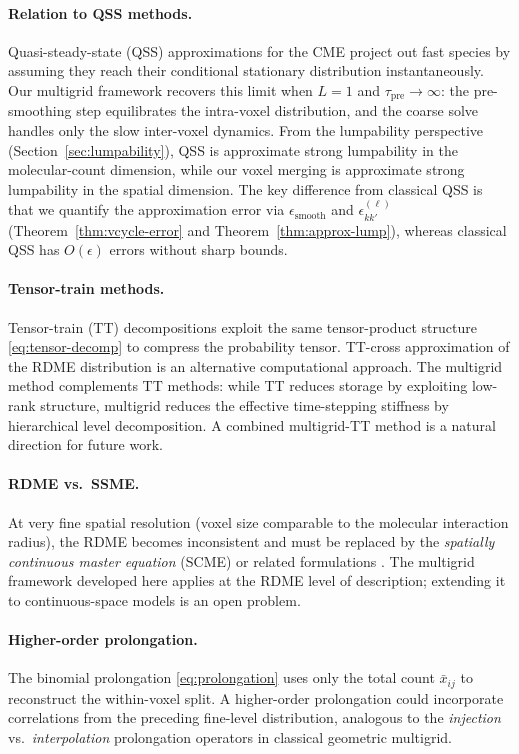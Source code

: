 \documentclass[review,onefignum,onetabnum]{siamart171218}
\begin{document}
\paragraph{Relation to QSS methods.}
Quasi-steady-state (QSS) approximations for the CME \cite{peles}
project out fast species by assuming they reach their conditional
stationary distribution instantaneously.  Our multigrid framework
recovers this limit when $L=1$ and $\tau_{\mathrm{pre}} \to \infty$:
the pre-smoothing step equilibrates the intra-voxel distribution,
and the coarse solve handles only the slow inter-voxel dynamics.
From the lumpability perspective (Section~\ref{sec:lumpability}),
QSS is approximate strong lumpability in the molecular-count
dimension, while our voxel merging is approximate strong
lumpability in the spatial dimension.  The key difference from
classical QSS is that we quantify the approximation error via
$\epsilon_{\mathrm{smooth}}$ and $\epsilon_{kk'}^{(\ell)}$
(Theorem~\ref{thm:vcycle-error} and
Theorem~\ref{thm:approx-lump}), whereas classical QSS has
$O(\epsilon)$ errors without sharp bounds.

\paragraph{Tensor-train methods.}
Tensor-train (TT) decompositions \cite{Kazeev2014} exploit the
same tensor-product structure \eqref{eq:tensor-decomp} to
compress the probability tensor.  TT-cross approximation of the
RDME distribution is an alternative computational approach.  The
multigrid method complements TT methods: while TT reduces storage
by exploiting low-rank structure, multigrid reduces the effective
time-stepping stiffness by hierarchical level decomposition.  A
combined multigrid-TT method is a natural direction for future
work.

\paragraph{RDME vs.\ SSME.}
At very fine spatial resolution (voxel size comparable to the
molecular interaction radius), the RDME becomes inconsistent and
must be replaced by the \emph{spatially continuous master
equation} (SCME) or related formulations \cite{Hellander2012}.
The multigrid framework developed here applies at the RDME level
of description; extending it to continuous-space models is an
open problem.

\paragraph{Higher-order prolongation.}
The binomial prolongation \eqref{eq:prolongation} uses only the
total count $\bar{x}_{ij}$ to reconstruct the within-voxel split.
A higher-order prolongation could incorporate correlations from
the preceding fine-level distribution, analogous to the
\emph{injection} vs.\ \emph{interpolation} prolongation operators
in classical geometric multigrid.



\end{document}
